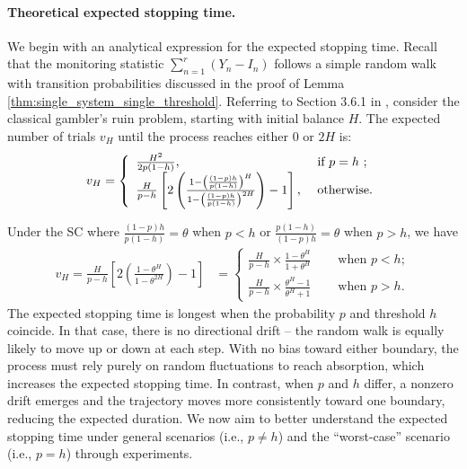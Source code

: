 \documentclass[11pt]{article}
\begin{document}
\paragraph{Theoretical expected stopping time.}
We begin with an analytical expression for the expected stopping time. Recall that the monitoring statistic $\sum_{n=1}^{r} ( Y_n-I_{n})$ follows a simple random walk with transition probabilities discussed in the proof of Lemma \ref{thm:single_system_single_threshold}. 
Referring to Section 3.6.1 in \citet{TaylorKarlin1994}, consider the classical gambler’s ruin problem, starting with initial balance $H$. The expected number of trials $v_H$ until the process reaches either $0$ or $2H$ is:
\begin{equation}
\label{eqn:ExpectedNumSteps}
    v_H = \left\{ \begin{array}{ll}
            \frac{H^2}{2p(1-h)}, & \mbox{ if $p=h$ };\\
            {H \over p-h}\left[2\left({{1-{{\left((1-p)h \over p (1-h) \right)}^H}}\over{{1-{{\left((1-p)h \over p(1-h) \right)}^{2H}}}}}\right)-1\right], & \mbox{ otherwise}.
        \end{array} \right.
\end{equation}

Under the SC where $\frac{(1-p)h}{p(1-h)}=\theta$ when $p<h$ or $\frac{p(1-h)}{(1-p)h}=\theta$ when $p>h$, we have
\begin{align*}
    v_H=\frac{H}{p-h}\left[ 2 \left(\frac{1-\theta^{H}}{1-\theta^{2H}}\right)-1 \right] &= \begin{cases}
        \frac{H}{p-h}\times \frac{1-\theta^{H}}{1+\theta^{H}} &\quad \text{ when }p<h; \\
        \frac{H}{p-h}\times \frac{\theta^{H}-1}{\theta^{H}+1} &\quad \text{ when }p>h.
    \end{cases}
\end{align*}
The expected stopping time is longest when the probability $p$ and threshold $h$ coincide. In that case, there is no directional drift -- the random walk is equally likely to move up or down at each step. With no bias toward either boundary, the process must rely purely on random fluctuations to reach absorption, which increases the expected stopping time. In contrast, when $p$ and $h$ differ, a nonzero drift emerges and the trajectory moves more consistently toward one boundary, reducing the expected duration. We now aim to better understand the expected stopping time under general scenarios (i.e., $p\not=h$) and the ``worst-case'' scenario (i.e., $p=h$) through experiments.
\end{document}
